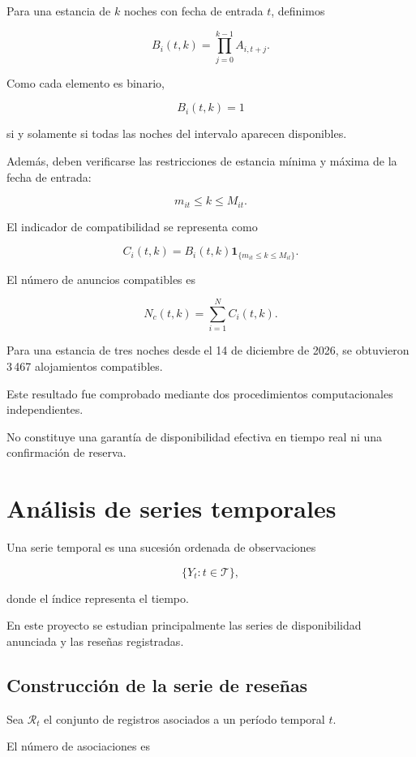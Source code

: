 \documentclass[11pt,a4paper]{article}
\begin{document}
Para una estancia de $k$ noches con fecha de
entrada $t$, definimos

\[
B_i(t,k)=
\prod_{j=0}^{k-1}A_{i,t+j}.
\]

Como cada elemento es binario,

\[
B_i(t,k)=1
\]

si y solamente si todas las noches del intervalo
aparecen disponibles.

Además, deben verificarse las restricciones de
estancia mínima y máxima de la fecha de entrada:

\[
m_{it}\leq k\leq M_{it}.
\]

El indicador de compatibilidad se representa como

\[
C_i(t,k)=
B_i(t,k)
\mathbf{1}_{\{m_{it}\leq k\leq M_{it}\}}.
\]

El número de anuncios compatibles es

\[
N_c(t,k)=\sum_{i=1}^{N}C_i(t,k).
\]

Para una estancia de tres noches desde el
14 de diciembre de 2026, se obtuvieron
3\,467 alojamientos compatibles.

Este resultado fue comprobado mediante dos
procedimientos computacionales independientes.

No constituye una garantía de disponibilidad
efectiva en tiempo real ni una confirmación
de reserva.


\section{Análisis de series temporales}

Una serie temporal es una sucesión ordenada
de observaciones

\[
\{Y_t:t\in\mathcal{T}\},
\]

donde el índice representa el tiempo.

En este proyecto se estudian principalmente
las series de disponibilidad anunciada y
las reseñas registradas.

\subsection{Construcción de la serie de reseñas}

Sea $\mathcal{R}_t$ el conjunto de registros
asociados a un período temporal $t$.

El número de asociaciones es
\end{document}
